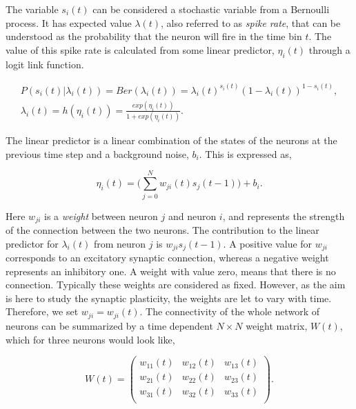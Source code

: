 The variable $s_{i}(t)$ can be considered a stochastic variable from a Bernoulli process. It has expected value $\lambda (t)$, also referred to as \textit{spike rate}, that can be understood as the probability that the neuron will fire in the time bin $t$. The value of this spike rate is calculated from some linear predictor, $\eta_i(t)$ through a logit link function. 

\begin{equation}
\label{eq:prob}
\begin{split}
P(s_i(t)|\lambda_i(t)) =  Ber(\lambda_i(t)) = \lambda_i(t)^{s_i(t)}(1-\lambda_i(t))^{1-s_i(t)}, \\ \lambda_i(t) = h(\eta_i(t))= \frac{exp(\eta_i(t))}{1+exp(\eta_i(t))}.
\end{split}
\end{equation}

The linear predictor is a linear combination of the states of the neurons at the previous time step and a background noise, $b_i$. This is expressed as,

\begin{equation}
\label{eq:lin_pred}
    \eta_i(t) = \Big (\sum_{j=0}^{N}  w_{ji}(t)s_j(t-1) \Big) + b_i.
\end{equation}

Here $w_{ji}$ is a \textit{weight} between neuron $j$ and neuron $i$, and represents the strength of the connection between the two neurons. The contribution to the linear predictor for $\lambda_i(t)$ from neuron $j$ is $w_{ji}s_j(t-1)$. A positive value for $w_{ji}$ corresponds to an excitatory synaptic connection, whereas a negative weight represents an inhibitory one. A weight with value zero, means that there is no connection. Typically these weights are considered as fixed. However, as the aim is here to study the synaptic plasticity, the weights are let to vary with time. Therefore, we set $w_{ji} = w_{ji}(t)$. The connectivity of the whole network of neurons can be summarized by a time dependent $N \times N$ weight matrix, $W(t)$, which for three neurons would look like, 

\begin{equation*}
W(t) = 
\begin{pmatrix}
w_{11}(t) & w_{12}(t) & w_{13}(t)\\
w_{21}(t) & w_{22}(t) & w_{23}(t)\\
w_{31}(t) & w_{32}(t) & w_{33}(t)\\
\end{pmatrix}.
\end{equation*}

